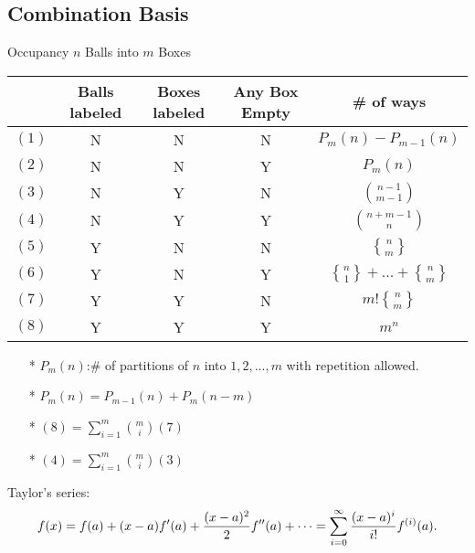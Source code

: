 \documentclass[a4paper]{amsart}
\newcommand{\stirlingsecond}[2]{\genfrac{\{}{\}}{0pt}{}{#1}{#2}}
\begin{document}
    \subsection{Combination Basis}
    		Occupancy $n$ Balls into $m$ Boxes
      \ 

      \begin{tabular}{|c|c|c|c|c|}
        \hline
         & Balls labeled & Boxes labeled & Any Box Empty & \# of ways \\ \hline
        $(1)$ & N & N & N & $P_m(n)-P_{m-1}(n)$ \\ \hline
        $(2)$ & N & N & Y & $P_m(n)$ \\ \hline
        $(3)$ & N & Y & N & $\binom{n-1}{m-1}$ \\ \hline
        $(4)$ & N & Y & Y & $\binom{n+m-1}{n}$ \\ \hline
        $(5)$ & Y & N & N & $\stirlingsecond{n}{m}$ \\ \hline
        $(6)$ & Y & N & Y & $\stirlingsecond{n}{1}+...+\stirlingsecond{n}{m}$ \\ \hline
        $(7)$ & Y & Y & N & $m!\stirlingsecond{n}{m}$ \\ \hline
        $(8)$ & Y & Y & Y & $m^n$ \\ \hline
      \end{tabular}
    \begin{enumerate}
    \item[*] $P_m(n)$:\# of partitions of $n$ into $1,2,...,m$ with repetition allowed.
    \item[*] $P_m(n)=P_{m-1}(n)+P_{m}(n-m)$
    \item[*] $(8)=\sum^m_{i=1}\binom{m}{i}(7)$
    \item[*] $(4)=\sum^m_{i=1}\binom{m}{i}(3)$
    \end{enumerate}
    Taylor's series:
$$
f(x) = f(a) + (x-a)f'(a) + {(x-a)^2 \over 2} f''(a) + \cdots = \sum_{i=0}^\infty {(x-a)^i \over i!} f^{(i)}(a).
$$




  \enlargethispage*{\baselineskip}
  \pagebreak

  




\end{document}
